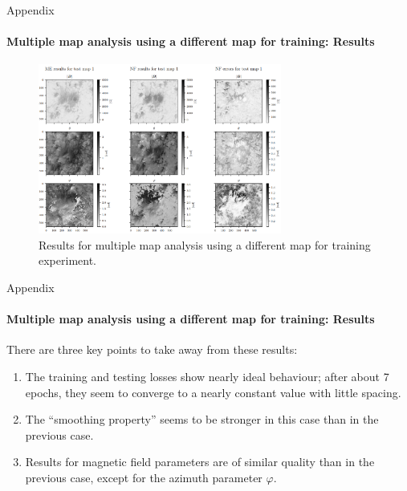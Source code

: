 \documentclass{beamer}
\begin{document}
\begin{frame}[allowframebreaks]{Appendix}
	\vspace{-0.4cm}
	\framesubtitle{Multiple map analysis using a different map for training: Results} %
	\begin{figure}[h!]
		\centering
		\includegraphics[width=8cm]{figures/presentation/exp4_fig1.png}
		\caption{Results for multiple map analysis using a different map for training experiment.}
		\label{fig:exp4_fig1}
	\end{figure}
\end{frame}

\begin{frame}[allowframebreaks]{Appendix}
	\vspace{-0.4cm}
	\framesubtitle{Multiple map analysis using a different map for training: Results} 
	There are three key points to take away from these results:
	\begin{enumerate}
		\item The training and testing losses show nearly ideal behaviour; after about 7 epochs, they seem to converge to a nearly constant value with little spacing.
		\item The ``smoothing property'' seems to be stronger in this case than in the previous case.
		\item Results for magnetic field parameters are of similar quality than in the previous case, except for the azimuth parameter $\varphi$.
	\end{enumerate}
\end{frame}
\end{document}

